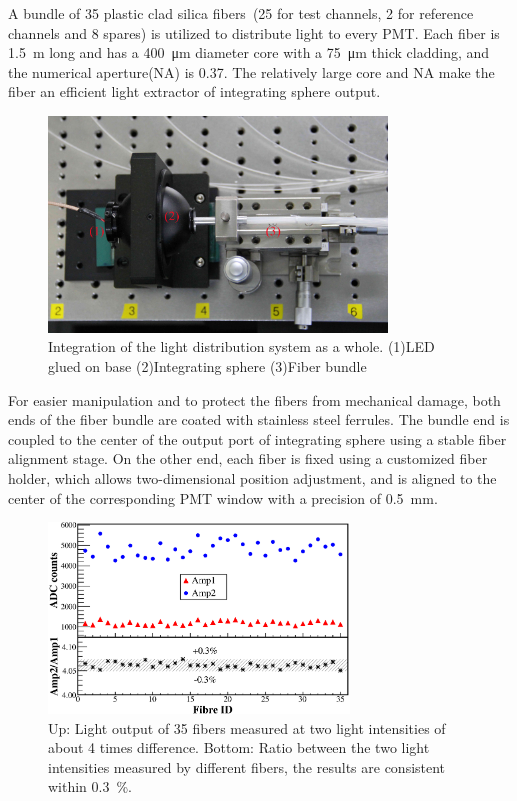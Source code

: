 \documentclass[5p, times]{elsarticle}
\begin{document}
A bundle of 35 plastic clad silica fibers~\cite{optical_fibre}(25 for test channels, 2 for reference channels and 8 spares) is utilized to distribute light to every PMT.
Each fiber is \SI{1.5}{\meter} long and has a \SI{400}{\micro\meter} diameter core with a \SI{75}{\micro\meter} thick cladding, and the numerical aperture(NA) is 0.37.
The relatively large core and NA make the fiber an efficient light extractor of integrating sphere output. 

\begin{figure}
 \centering
 \includegraphics[width=90mm]{light_dist_label}
\caption{Integration of the light distribution system as a whole.
(1)LED glued on base (2)Integrating sphere (3)Fiber bundle}
\label{fig:light_source}
\end{figure} 

For easier manipulation and to protect the fibers from mechanical damage, both ends of the fiber bundle are coated with stainless steel ferrules.
The bundle end is coupled to the center of the output port of integrating sphere using a stable fiber alignment stage.
On the other end, each fiber is fixed using a customized fiber holder, which allows two-dimensional position adjustment, and is aligned to the center of the corresponding PMT window with a precision of \SI{0.5}{\milli\meter}.

\begin{figure}
 \centering
 \includegraphics[width=80mm]{fibre_diff}
\caption{Up: Light output of 35 fibers measured at two light intensities of about 4 times difference.
Bottom: Ratio between the two light intensities measured by different fibers, the results are consistent within \textpm\SI{0.3}{\percent}.}
\label{fig:fibre_diff}
\end{figure} 
\end{document}
